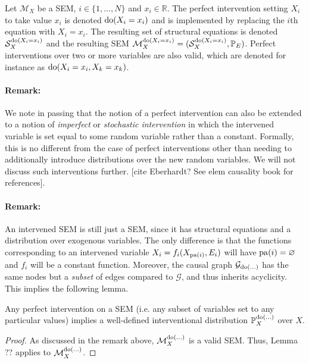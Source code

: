 \begin{definition}
	Let $\mathcal{M}_X$ be a SEM, $i \in \{1,\ldots,N \}$ and $x_i \in \mathbb{R}$. The perfect intervention setting $X_i$ to take value $x_i$ is denoted $\operatorname{do}(X_i = x_i)$ and is implemented by replacing the $i$th equation with $X_i = x_i$. The resulting set of structural equations is denoted $\mathcal{S}_X^{\operatorname{do}(X_i=x_i)}$ and the resulting SEM $\mathcal{M}_X^{\operatorname{do}(X_i=x_i)} = (\mathcal{S}_X^{\operatorname{do}(X_i=x_i)}, \mathbb{P}_E)$.
	Perfect interventions over two or more variables are also valid, which are denoted for instance as $\operatorname{do}(X_i = x_i, X_k = x_k)$.
\end{definition}

\paragraph{Remark:} We note in passing that the notion of a perfect intervention can also be extended to a notion of \emph{imperfect} or \emph{stochastic intervention} in which the intervened variable is set equal to some random variable rather than a constant. Formally, this is no different from the case of perfect interventions other than needing to additionally introduce distributions over the new random variables. We will not discuss such interventions further. [cite Eberhardt? See elem causality book for references].

\paragraph{Remark:} An intervened SEM is still just a SEM, since it has structural equations and a distribution over exogenous variables. The only difference is that the functions corresponding to an intervened variable $X_i = f_i(X_{\operatorname{pa}(i)}, E_i)$ will have $\operatorname{pa}(i) = \varnothing$ and $f_i$ will be a constant function. Moreover, the causal graph $\mathcal{G}_{\operatorname{do}(\ldots)}$ has the same nodes but a \emph{subset} of edges compared to $\mathcal{G}$, and thus inherits acyclicity. This implies the following lemma.

\begin{lemma}\label{lemma:acyclic-sem-well-defined-int-dist}
	Any perfect intervention on a SEM (i.e. any subset of variables set to any particular values) implies a well-defined interventional distribution $\mathbb{P}^{\operatorname{do}(...)}_X$ over $X$.
\end{lemma}
\begin{proof}
	As discussed in the remark above, $\mathcal{M}_X^{\operatorname{do}(...)}$ is a valid SEM. Thus, Lemma ?? applies to $\mathcal{M}_X^{\operatorname{do}(...)}$.
\end{proof}
	
